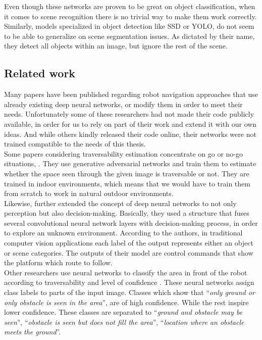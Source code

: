 \documentclass[12pt,a4paper,table,dvipsnames,tikz]{report}
\newcommand{\defn}[1]{\enquote{\textit{#1}}}
\newcommand{\acronym}{\MakeUppercase}
\begin{document}
	Even though these networks are proven to be great on object classification, when 
	it comes to scene recognition there is no trivial way to make them work correctly.
	\\
	
	Similarly, models specialized in object detection like \acronym{ssd} or \acronym{yolo}, 
	do not seem to be able to generalize on scene segmentation issues. As dictated by their 
	name, they detect all objects within an image, but ignore the rest of the scene.
	\\
	
	
	\subsection{Related work}
	\label{sec:fg:nn:rel}
	
	Many papers have been published regarding robot navigation approaches that use 
	already existing deep neural networks, or modify them in order to meet their needs.
	Unfortunately some of these researchers had not made their code publicly available, 
	in order for us to rely on part of their work and extend it with our own ideas. And 
	while others kindly released their code online, their networks were not trained 
	compatible to the needs of this thesis.
	\\
	
	Some papers considering traversability estimation concentrate on go or no-go situations, 
	\citep{HiroseGonet, HiroseVunet}. They use generative adversarial networks and train 
	them to estimate whether the space seen through the given image is traversable or not. 
	They are trained in indoor environments, which means that we would have to train them 
	from scratch to work in natural outdoor environments.
	\\
	
	Likewise, \citet{Tai} further extended the concept of deep neural networks to not only 
	perception but also decision-making. Basically, they used a structure that fuses several 
	convolutional neural network layers with decision-making process, in order to explore 
	an unknown environment. According to the authors, in traditional computer vision 
	applications each label of the output represents either an object or scene categories. 
	The outputs of their model are control commands that show the platform which route to 
	follow.
	\\
	
	Other researchers use neural networks to classify the area in front of the robot 
	according to traversability and level of confidence \citep{Sermanet, Hadsell}. These 
	neural networks assign class labels to parts of the input image. Classes which show 
	that \defn{only ground or only obstacle is seen in the area}, are of high confidence. 
	While the rest inspire lower confidence. These classes are separated to 
	\defn{ground and obstacle may be seen}, \defn{obstacle is seen but does not fill the area}, 
	\defn{location where an obstacle meets the ground}.
	\\
	
\end{document}
